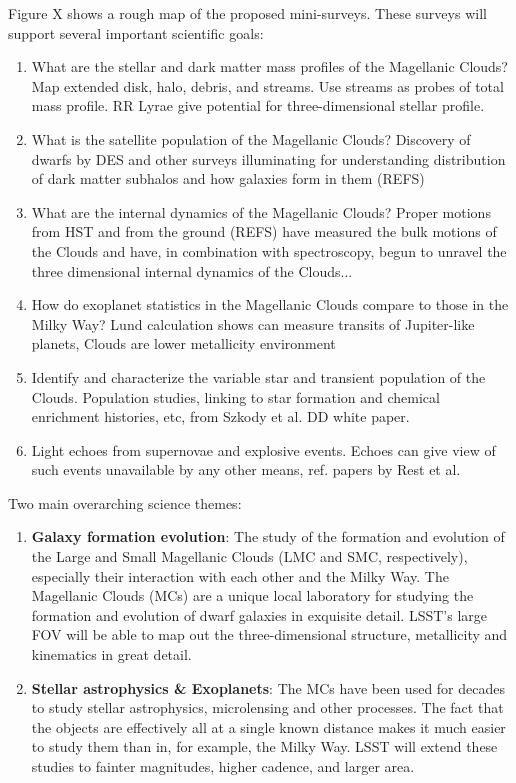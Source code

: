 Figure X shows a rough map of the proposed mini-surveys.  
These surveys will support several important scientific goals:
\begin{enumerate}
\item What are the stellar and dark matter mass profiles of the Magellanic Clouds?  Map extended disk, halo, debris, and streams.  Use streams as probes of total mass profile.  RR Lyrae give potential for three-dimensional stellar profile.
\item What is the satellite population of the Magellanic Clouds?  Discovery of dwarfs by DES and other surveys illuminating for understanding distribution of dark matter subhalos and how galaxies form in them (REFS)
\item What are the internal dynamics of the Magellanic Clouds?  Proper motions from HST and from the ground (REFS) have measured the bulk motions of the Clouds and have, in combination with spectroscopy, begun to unravel the three dimensional internal dynamics of the Clouds...
\item How do exoplanet statistics in the Magellanic Clouds compare to those in the Milky Way?  Lund calculation shows can measure transits of Jupiter-like planets, Clouds are lower metallicity environment
\item Identify and characterize the variable star and transient population of the Clouds.  Population studies, linking to star formation and chemical enrichment histories, etc, from Szkody et al. DD white paper.
\item Light echoes from supernovae and explosive events.  Echoes can give view of such events unavailable by any other means, ref. papers by Rest et al.
\end{enumerate}


Two main overarching science themes:
\begin{enumerate}
\item {\bf Galaxy formation evolution}: The study of the formation and evolution of the Large and Small
  Magellanic Clouds (LMC and SMC, respectively), especially their interaction with each other and the Milky Way.
  The Magellanic Clouds (MCs) are a unique local laboratory for studying the formation and evolution of
  dwarf galaxies in exquisite detail.  LSST's large FOV will be able to map out the three-dimensional
  structure, metallicity and kinematics in great detail.
\item {\bf Stellar astrophysics \& Exoplanets}:  The MCs have been used for decades to study stellar
  astrophysics, microlensing and other processes.  The fact that the objects are effectively all at a single
  known distance makes it much easier to study them than in, for example, the Milky Way.  LSST will extend
  these studies to fainter magnitudes, higher cadence, and larger area.
\end{enumerate}

